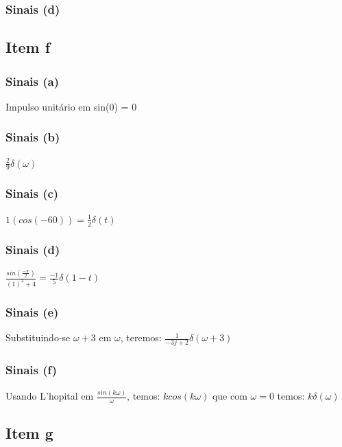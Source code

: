 \documentclass[a4paper, 12pt]{article}
\begin{document}
			\subsubsection{Sinais (d)}
		\subsection{Item f}	
			\subsubsection{Sinais (a)}
			Impulso unitário em sin(0) = 0
			\subsubsection{Sinais (b)}
			$\frac{2}{9}\delta(\omega)$
			\subsubsection{Sinais (c)}
			$1(cos(-60)) = \frac{1}{2}\delta(t)$
			\subsubsection{Sinais (d)}
			$\frac{sin(\frac{-\pi}{2})}{(1)^{2}+4} = \frac{-1}{5}\delta(1-t)$
			\subsubsection{Sinais (e)}
			Substituindo-se $\omega + 3$ em $\omega$, teremos: $\frac{1}{-3j + 2}\delta(\omega+3)$			
			\subsubsection{Sinais (f)}	
			Usando L'hopital em $\frac{sin(k\omega)}{\omega}$, temos: $kcos(k\omega)$ que com $\omega = 0$ temos: $k\delta(\omega)$		
		\subsection{Item g}	
\end{document}
